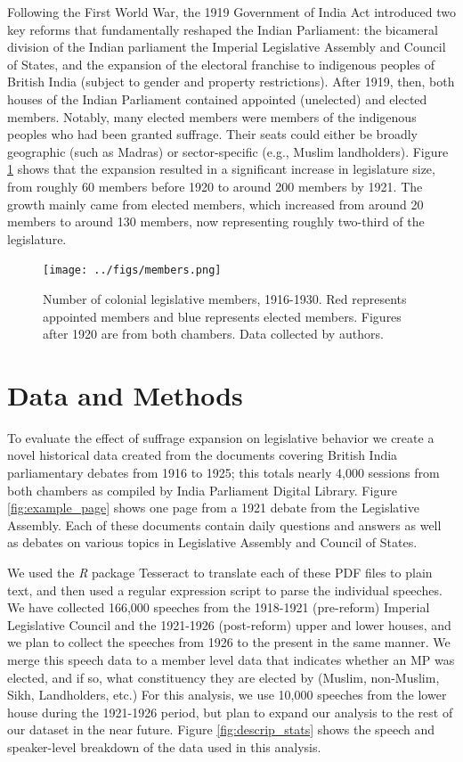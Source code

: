 \documentclass[12pt,letter]{article}
\begin{document}
Following the First World War, the 1919 Government of India Act introduced two key reforms that fundamentally reshaped the Indian Parliament: the bicameral division of the Indian parliament the Imperial Legislative Assembly and Council of States, and the expansion of the electoral franchise to indigenous peoples of British India (subject to gender and property restrictions). After 1919, then, both houses of the Indian Parliament contained appointed (unelected) and elected members. Notably, many elected members were members of the indigenous peoples who had been granted suffrage. Their seats could either be broadly geographic (such as Madras) or sector-specific (e.g., Muslim landholders). Figure \ref{fig:leg_before_after} shows that the expansion resulted in a significant increase in legislature size, from roughly 60 members before 1920 to around 200 members by 1921. The growth mainly came from elected members, which increased from around 20 members to around 130 members, now representing roughly two-third of the legislature.\par

\begin{figure}
    \centering
    \texttt{[image: ../figs/members.png]}
    \caption{Number of colonial legislative members, 1916-1930. Red represents appointed members and blue represents elected members. Figures after 1920 are from both chambers. Data collected by authors.}
    \label{fig:leg_before_after}
\end{figure}

\section{Data and Methods}
To evaluate the effect of suffrage expansion on legislative behavior we create a novel historical data created from the documents covering British India parliamentary debates from 1916 to 1925; this totals nearly 4,000 sessions from both chambers as compiled by India Parliament Digital Library. Figure \ref{fig:example_page} shows one page from a 1921 debate from the Legislative Assembly. Each of these documents contain daily questions and answers as well as debates on various topics in Legislative Assembly and Council of States.

We used the \textit{R} package Tesseract to translate each of these PDF files to plain text, and then used a regular expression script to parse the individual speeches. We have collected 166,000 speeches from the 1918-1921 (pre-reform) Imperial Legislative Council and the 1921-1926 (post-reform) upper and lower houses, and we plan to collect the speeches from 1926 to the present in the same manner. We merge this speech data to a member level data that indicates whether an MP was elected, and if so, what constituency they are elected by (Muslim, non-Muslim, Sikh, Landholders, etc.) For this analysis, we use 10,000 speeches from the lower house during the 1921-1926 period, but plan to expand our analysis to the rest of our dataset in the near future. Figure \ref{fig:descrip_stats} shows the speech and speaker-level breakdown of the data used in this analysis.\par
\end{document}
